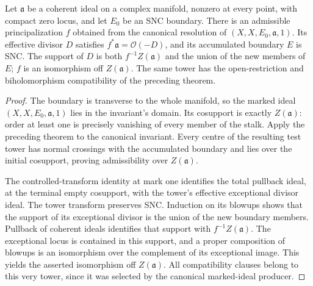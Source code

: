 \begin{theorem}
\label{hir:canonical-elementary-principalization-boundary}
Let $\mathfrak a$ be a coherent ideal on a complex manifold, nonzero
at every point, with compact zero locus, and let $E_0$ be an SNC boundary.
There is an admissible principalization $f$ obtained from the canonical
resolution of $(X,X,E_0,\mathfrak a,1)$. Its effective divisor $D$
satisfies $f^*\mathfrak a=\mathcal O(-D)$, and its accumulated boundary
$E$ is SNC. The support of $D$ is both $f^{-1}Z(\mathfrak a)$ and the
union of the new members of $E$; $f$ is an isomorphism off
$Z(\mathfrak a)$. The same tower has the open-restriction and
biholomorphism compatibility of the preceding theorem.
\leanok
\end{theorem}
\begin{proof}
The boundary is transverse to the whole manifold, so the marked ideal
$(X,X,E_0,\mathfrak a,1)$ lies in the invariant's domain. Its cosupport
is exactly $Z(\mathfrak a)$: order at least one is precisely vanishing
of every member of the stalk. Apply the preceding theorem to the
canonical invariant. Every centre of the resulting test tower has
normal crossings with the accumulated boundary and lies over the
initial cosupport, proving admissibility over $Z(\mathfrak a)$.

The controlled-transform identity at mark one identifies the total
pullback ideal, at the terminal empty cosupport, with the tower's
effective exceptional divisor ideal. The tower transform preserves
SNC. Induction on its blowups shows that the support of its exceptional
divisor is the union of the new boundary members. Pullback of coherent
ideals identifies that support with $f^{-1}Z(\mathfrak a)$.
The exceptional locus is contained in this support, and a proper
composition of blowups is an isomorphism over the complement of its
exceptional image. This yields the asserted isomorphism off
$Z(\mathfrak a)$. All compatibility clauses belong to this very tower,
since it was selected by the canonical marked-ideal producer.
\end{proof}

